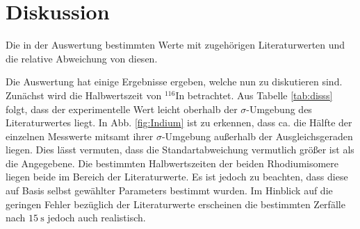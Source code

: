 
\section{Diskussion}
\label{sec:Diskussion}
\begin{table}
	\centering
	\caption{Die in der Auswertung bestimmten Werte mit zugehörigen Literaturwerten und die relative Abweichung von diesen.}
	
	\label{tab:disss}
\end{table}
Die Auswertung hat einige Ergebnisse ergeben, welche nun zu diskutieren sind. Zunächst wird die Halbwertszeit von $^{116}$In betrachtet. Aus  Tabelle \ref{tab:disss} folgt, dass der experimentelle Wert leicht oberhalb der $\sigma$-Umgebung des Literaturwertes liegt. In Abb. \ref{fig:Indium} ist zu erkennen, dass ca. die Hälfte der einzelnen Messwerte mitsamt ihrer $\sigma$-Umgebung außerhalb der Ausgleichsgeraden liegen. Dies lässt vermuten, dass die Standartabweichung vermutlich größer ist als die Angegebene.
 Die bestimmten Halbwertszeiten der beiden Rhodiumisomere liegen beide im Bereich der Literaturwerte. Es ist jedoch zu beachten, dass diese auf Basis selbst gewählter Parameters bestimmt wurden. Im Hinblick auf die geringen Fehler bezüglich der Literaturwerte erscheinen die bestimmten Zerfälle nach $\SI{15}{\second}$ jedoch auch realistisch.  

